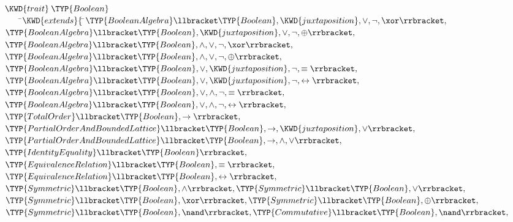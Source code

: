 \begin{Fortress}
\(\KWD{trait}\:\TYP{Boolean}\)\\
{\tt~~~~}\pushtabs\=\+\(    \KWD{extends} \{\, \null\)\pushtabs\=\+\(\TYP{BooleanAlgebra}\llbracket\TYP{Boolean},\KWD{juxtaposition},\vee,\neg,\xor\rrbracket,\)\\
\(              \TYP{BooleanAlgebra}\llbracket\TYP{Boolean},\KWD{juxtaposition},\vee,\neg,\oplus\rrbracket,\)\\
\(              \TYP{BooleanAlgebra}\llbracket\TYP{Boolean},\wedge,\vee,\neg,\xor\rrbracket,\)\\
\(              \TYP{BooleanAlgebra}\llbracket\TYP{Boolean},\wedge,\vee,\neg,\oplus\rrbracket,\)\\
\(              \TYP{BooleanAlgebra}\llbracket\TYP{Boolean},\vee,\KWD{juxtaposition},\neg,\equiv\rrbracket,\)\\
\(              \TYP{BooleanAlgebra}\llbracket\TYP{Boolean},\vee,\KWD{juxtaposition},\neg,\leftrightarrow\rrbracket,\)\\
\(              \TYP{BooleanAlgebra}\llbracket\TYP{Boolean},\vee,\wedge,\neg,\equiv\rrbracket,\)\\
\(              \TYP{BooleanAlgebra}\llbracket\TYP{Boolean},\vee,\wedge,\neg,\leftrightarrow\rrbracket,\)\\
\(              \TYP{TotalOrder}\llbracket\TYP{Boolean},\rightarrow\rrbracket,\)\\
\(              \TYP{PartialOrderAndBoundedLattice}\llbracket\TYP{Boolean},\rightarrow,\KWD{juxtaposition},\vee\rrbracket,\)\\
\(              \TYP{PartialOrderAndBoundedLattice}\llbracket\TYP{Boolean},\rightarrow,\wedge,\vee\rrbracket,\)\\
\(              \TYP{IdentityEquality}\llbracket\TYP{Boolean}\rrbracket,\)\\
\(              \TYP{EquivalenceRelation}\llbracket\TYP{Boolean},\equiv\rrbracket,\)\\
\(              \TYP{EquivalenceRelation}\llbracket\TYP{Boolean},\leftrightarrow\rrbracket,\)\\
\(              \TYP{Symmetric}\llbracket\TYP{Boolean},\wedge\rrbracket, \TYP{Symmetric}\llbracket\TYP{Boolean},\vee\rrbracket,\)\\
\(              \TYP{Symmetric}\llbracket\TYP{Boolean},\xor\rrbracket, \TYP{Symmetric}\llbracket\TYP{Boolean},\oplus\rrbracket,\)\\
\(              \TYP{Symmetric}\llbracket\TYP{Boolean},\nand\rrbracket, \TYP{Commutative}\llbracket\TYP{Boolean},\nand\rrbracket,\)\\

\end{Fortress}
